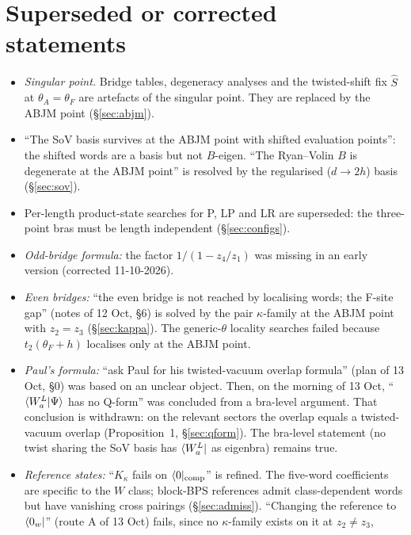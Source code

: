 \section{Superseded or corrected statements}\label{sec:superseded}

\begin{itemize}
\item \emph{Singular point.} Bridge tables, degeneracy analyses and the twisted-shift fix $\hat S$ at $\theta_A=\theta_F$ are artefacts
  of the singular point. They are replaced by the ABJM point (\S\ref{sec:abjm}).
\item ``The SoV basis survives at the ABJM point with shifted evaluation points'': the shifted words are a basis but not
  $B$-eigen. ``The Ryan--Volin $B$ is degenerate at the ABJM point'' is resolved by the regularised ($d\to2h$) basis
  (\S\ref{sec:sov}).
\item Per-length product-state searches for P, LP and LR are superseded: the three-point bras must be length independent
  (\S\ref{sec:configs}).
\item \emph{Odd-bridge formula:} the factor $1/(1-z_4/z_1)$ was missing in an early version (corrected 11-10-2026).
\item \emph{Even bridges:} ``the even bridge is not reached by localising words; the F-site gap'' (notes of 12 Oct, \S6) is
  solved by the pair $\kappa$-family at the ABJM point with $z_2=z_3$ (\S\ref{sec:kappa}). The generic-$\theta$ locality
  searches failed because $t_2(\theta_F+h)$ localises only at the ABJM point.
\item \emph{Paul's formula:} ``ask Paul for his twisted-vacuum overlap formula'' (plan of 13 Oct, \S0) was based on an unclear
  object. Then, on the morning of 13 Oct, ``$\langle W_a^L|\Psi\rangle$ has no Q-form'' was concluded from a bra-level argument. That
  conclusion is withdrawn: on the relevant sectors the overlap equals a twisted-vacuum overlap (Proposition~1,
  \S\ref{sec:qform}). The bra-level statement (no twist sharing the SoV basis has $\langle W_a^L|$ as eigenbra) remains true.
\item \emph{Reference states:} ``$K_\kappa$ fails on $\langle0|_{\rm comp}$'' is refined. The five-word coefficients are specific to the
  $W$ class; block-BPS references admit class-dependent words but have vanishing cross pairings (\S\ref{sec:admiss}).
  ``Changing the reference to $\langle0_w|$'' (route A of 13 Oct) fails, since no $\kappa$-family exists on it at $z_2\ne z_3$,

\end{itemize}
